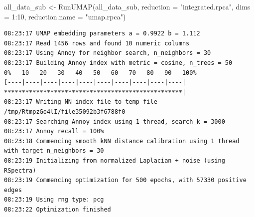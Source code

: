 \documentclass[
  letterpaper,
  DIV=11,
  numbers=noendperiod]{scrreprt}
\newenvironment{Shaded}{\begin{snugshade}}{\end{snugshade}}
\newcommand{\AttributeTok}[1]{\textcolor[rgb]{0.40,0.45,0.13}{#1}}
\newcommand{\DecValTok}[1]{\textcolor[rgb]{0.68,0.00,0.00}{#1}}
\newcommand{\FunctionTok}[1]{\textcolor[rgb]{0.28,0.35,0.67}{#1}}
\newcommand{\NormalTok}[1]{\textcolor[rgb]{0.00,0.23,0.31}{#1}}
\newcommand{\OtherTok}[1]{\textcolor[rgb]{0.00,0.23,0.31}{#1}}
\newcommand{\SpecialCharTok}[1]{\textcolor[rgb]{0.37,0.37,0.37}{#1}}
\newcommand{\StringTok}[1]{\textcolor[rgb]{0.13,0.47,0.30}{#1}}
\begin{document}
\begin{Shaded}
\begin{Highlighting}[]
\NormalTok{all\_data\_sub }\OtherTok{\textless{}{-}} \FunctionTok{RunUMAP}\NormalTok{(all\_data\_sub, }\AttributeTok{reduction =} \StringTok{"integrated.rpca"}\NormalTok{, }\AttributeTok{dims =} \DecValTok{1}\SpecialCharTok{:}\DecValTok{10}\NormalTok{, }\AttributeTok{reduction.name =} \StringTok{"umap.rpca"}\NormalTok{)}
\end{Highlighting}
\end{Shaded}

\begin{verbatim}
08:23:17 UMAP embedding parameters a = 0.9922 b = 1.112
08:23:17 Read 1456 rows and found 10 numeric columns
08:23:17 Using Annoy for neighbor search, n_neighbors = 30
08:23:17 Building Annoy index with metric = cosine, n_trees = 50
0%   10   20   30   40   50   60   70   80   90   100%
[----|----|----|----|----|----|----|----|----|----|
**************************************************|
08:23:17 Writing NN index file to temp file /tmp/RtmpzGo4lI/file35092b3f6788f0
08:23:17 Searching Annoy index using 1 thread, search_k = 3000
08:23:17 Annoy recall = 100%
08:23:18 Commencing smooth kNN distance calibration using 1 thread with target n_neighbors = 30
08:23:19 Initializing from normalized Laplacian + noise (using RSpectra)
08:23:19 Commencing optimization for 500 epochs, with 57330 positive edges
08:23:19 Using rng type: pcg
08:23:22 Optimization finished
\end{verbatim}
\end{document}

